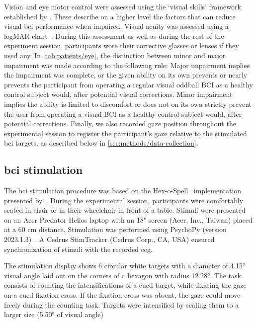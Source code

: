 \documentclass{article}
\begin{document}
Vision and eye motor control were assessed using the `visual skills' framework
established by \textcite{FriedOken2020}.
These describe on a higher level the factors that can reduce visual \ac{bci}
performance when impaired.
Visual acuity was assessed using a logMAR chart~\cite{Bailey1976}.
During this assessment as well as during the rest of the experiment
session, participants wore their corrective glasses or lenses if they used any.
In \cref{tab:patients/eye}, the distinction between minor and major impairment
was made according to the following rule:
Major impairment implies the impairment was complete,
or the given ability on its own prevents or nearly prevents the participant from
operating a regular visual oddball BCI as a healthy control subject would,
after potential visual corrections.
Minor impairment implies the ability is limited to discomfort or does
not on its own strictly prevent the user from operating a visual BCI as a healthy
control subject would, after potential corrections.
Finally, we also recorded gaze position throughout the experimental session to
register the participant's gaze relative to the stimulated \ac{bci} targets, as
described below in \cref{sec:methods/data-collection}.


\subsection{\Acs{bci} stimulation}
\label{sec:methods/bci}

The \ac{bci} stimulation procedure was based on the
Hex-o-Spell~\cite{Treder2010} implementation presented
by~\textcite{VanDenKerchove2024}.
During the experimental session, participants were comfortably seated in
chair or in their wheelchair in front of a table.
Stimuli were presented on an Acer Predator Helios laptop with an 18" screen (Acer,
Inc., Taiwan) placed at a 60 cm distance.
Stimulation was performed using PsychoPy (version 2023.1.3)~\cite{Peirce2019}.
A Cedrus StimTracker (Cedrus Corp., CA, USA) ensured synchronization of stimuli with the
recorded \ac{eeg}.

The stimulation display shows 6 circular white targets with a diameter of 4.15°
visual angle laid out on the corners of a hexagon with radius 12.28°.
The task consists of counting the intensifications of a cued target, while fixating
the gaze on a cued fixation cross.
If the fixation cross was absent, the gaze could move freely during the counting task.
Targets were intensified by scaling them to a larger size (5.50° of visual angle)
\end{document}
